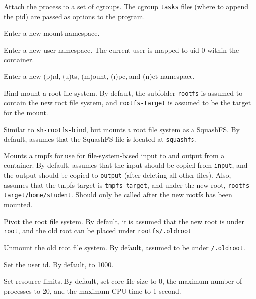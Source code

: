 \begin{description}[\setleftmargin{0.2in}\breaklabel\setlabelstyle{\tt}]

\item [cgroups] Attach the process to a set of cgroups. The cgroup
\texttt{tasks} files (where to append the pid) are passed as options to the
program.

\item [mnt] Enter a new mount namespace.

\item [user] Enter a new user namespace. The current user is mapped to uid 0
within the container.

\item [pumin] Enter a new (p)id, (u)ts, (m)ount, (i)pc, and (n)et namespace.

\item [sh-rootfs-bind] Bind-mount a root file system. By default, the subfolder
\texttt{rootfs} is assumed to contain the new root file system, and
\texttt{rootfs-target} is assumed to be the target for the mount.

\item [sh-rootfs-squashfs] Similar to \texttt{sh-rootfs-bind}, but mounts a
root file system as a SquashFS. By default, assumes that the SquashFS file is
located at \texttt{squashfs}.

\item [sh-iofs] Mounts a tmpfs for use for file-system-based input to and
output from a container. By default, assumes that the input should be copied
from \texttt{input}, and the output should be copied to \texttt{output} (after
deleting all other files). Also, assumes that the tmpfs target is
\texttt{tmpfs-target}, and under the new root,
\texttt{rootfs-target/home/student}. Should only be called after the new rootfs
has been mounted.

\item [pivot-root] Pivot the root file system. By default, it is assumed that
the new root is under \texttt{root}, and the old root can be placed under
\texttt{rootfs/.oldroot}.

\item [umount-oldroot] Unmount the old root file system. By default, assumed to
be under \texttt{/.oldroot}.

\item [setuid] Set the user id. By default, to 1000.

\item [rlimits] Set resource limits. By default, set core file size to 0, the
maximum number of processes to 20, and the maximum CPU time to 1 second.

\end{description}

